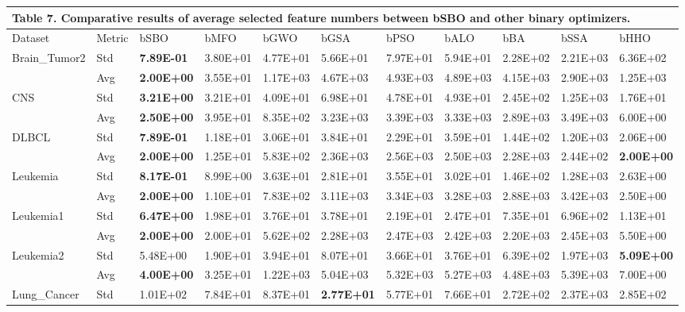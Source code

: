 \documentclass{article} %
\begin{document}
\begin{tabular}{|p{0.4in}|p{0.4in}|p{0.4in}|p{0.4in}|p{0.4in}|p{0.4in}|p{0.4in}|p{0.4in}|p{0.4in}|p{0.4in}|p{0.4in}|} \hline 
\multicolumn{11}{|p{1in}|}{\textbf{Table }7\textbf{. }Comparative results of average selected feature numbers between bSBO and other binary optimizers.\textbf{}} \\ \hline 
Dataset & Metric & bSBO & bMFO & bGWO & bGSA & bPSO & bALO & bBA & bSSA & bHHO \\ \hline 
Brain\_Tumor2 & Std & \textbf{7.89E-01} & 3.80E+01 & 4.77E+01 & 5.66E+01 & 7.97E+01 & 5.94E+01 & 2.28E+02 & 2.21E+03 & 6.36E+02 \\ \hline 
 & Avg & \textbf{2.00E+00} & 3.55E+01 & 1.17E+03 & 4.67E+03 & 4.93E+03 & 4.89E+03 & 4.15E+03 & 2.90E+03 & 1.25E+03 \\ \hline 
CNS & Std & \textbf{3.21E+00} & 3.21E+01 & 4.09E+01 & 6.98E+01 & 4.78E+01 & 4.93E+01 & 2.45E+02 & 1.25E+03 & 1.76E+01 \\ \hline 
 & Avg & \textbf{2.50E+00} & 3.95E+01 & 8.35E+02 & 3.23E+03 & 3.39E+03 & 3.33E+03 & 2.89E+03 & 3.49E+03 & 6.00E+00 \\ \hline 
DLBCL & Std & \textbf{7.89E-01} & 1.18E+01 & 3.06E+01 & 3.84E+01 & 2.29E+01 & 3.59E+01 & 1.44E+02 & 1.20E+03 & 2.06E+00 \\ \hline 
 & Avg & \textbf{2.00E+00} & 1.25E+01 & 5.83E+02 & 2.36E+03 & 2.56E+03 & 2.50E+03 & 2.28E+03 & 2.44E+02 & \textbf{2.00E+00} \\ \hline 
Leukemia & Std & \textbf{8.17E-01} & 8.99E+00 & 3.63E+01 & 2.81E+01 & 3.55E+01 & 3.02E+01 & 1.46E+02 & 1.28E+03 & 2.63E+00 \\ \hline 
 & Avg & \textbf{2.00E+00} & 1.10E+01 & 7.83E+02 & 3.11E+03 & 3.34E+03 & 3.28E+03 & 2.88E+03 & 3.42E+03 & 2.50E+00 \\ \hline 
Leukemia1 & Std & \textbf{6.47E+00} & 1.98E+01 & 3.76E+01 & 3.78E+01 & 2.19E+01 & 2.47E+01 & 7.35E+01 & 6.96E+02 & 1.13E+01 \\ \hline 
 & Avg & \textbf{2.00E+00} & 2.00E+01 & 5.62E+02 & 2.28E+03 & 2.47E+03 & 2.42E+03 & 2.20E+03 & 2.45E+03 & 5.50E+00 \\ \hline 
Leukemia2 & Std & 5.48E+00 & 1.90E+01 & 3.94E+01 & 8.07E+01 & 3.66E+01 & 3.76E+01 & 6.39E+02 & 1.97E+03 & \textbf{5.09E+00} \\ \hline 
 & Avg & \textbf{4.00E+00} & 3.25E+01 & 1.22E+03 & 5.04E+03 & 5.32E+03 & 5.27E+03 & 4.48E+03 & 5.39E+03 & 7.00E+00 \\ \hline 
Lung\_Cancer & Std & 1.01E+02 & 7.84E+01 & 8.37E+01 & \textbf{2.77E+01} & 5.77E+01 & 7.66E+01 & 2.72E+02 & 2.37E+03 & 2.85E+02 \\ \hline 

\end{tabular}
\end{document}
